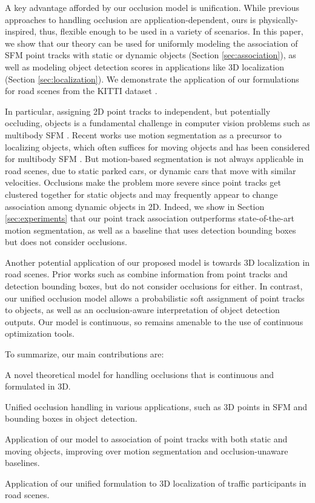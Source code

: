 A key advantage afforded by our occlusion model is unification. While previous approaches to handling occlusion are application-dependent, ours is physically-inspired, thus, flexible enough to be used in a variety of scenarios. In this paper, we show that our theory can be used for uniformly modeling the association of SFM point tracks with static or dynamic objects (Section \ref{sec:association}), as well as modeling object detection scores in applications like 3D localization (Section \ref{sec:localization}). We demonstrate the application of our formulations for road scenes from the KITTI dataset \cite{Geiger_etal_2012}.


In particular, assigning 2D point tracks to independent, but potentially occluding, objects is a fundamental challenge in computer vision problems such as multibody SFM \cite{Ozden_etal_2010}. Recent works use motion segmentation \cite{Rao_etal_2010,Brox_Malik_2010} as a precursor to localizing objects, which often suffices for moving objects \cite{Tron_Vidal_2007} and has been considered for multibody SFM \cite{Kundu_etal_2011}. But motion-based segmentation is not always applicable in road scenes, due to static parked cars, or dynamic cars that move with similar velocities. Occlusions make the problem more severe since point tracks get clustered together for static objects and may frequently appear to change association among dynamic objects in 2D.
Indeed, we show in Section \ref{sec:experiments} that our point track association outperforms state-of-the-art motion segmentation, as well as a baseline that uses detection bounding boxes but does not consider occlusions.

Another potential application of our proposed model is towards 3D localization in road scenes. Prior works such as \cite{Song_Chandraker_2015} combine information from point tracks and detection bounding boxes, but do not consider occlusions for either. In contrast, our unified occlusion model allows a probabilistic soft assignment of point tracks to objects, as well as an occlusion-aware interpretation of object detection outputs. Our model is continuous, so remains amenable to the use of continuous optimization tools.

To summarize, our main contributions are:
\vspace{-0.2cm}
\begin{tight_itemize}
\item A novel theoretical model for handling occlusions that is continuous and formulated in 3D.
\item Unified occlusion handling in various applications, such as 3D points in SFM and bounding boxes in object detection.
\item Application of our model to association of point tracks with both static and moving objects, improving over motion segmentation and occlusion-unaware baselines.
\item Application of our unified formulation to 3D localization of traffic participants in road scenes.
\end{tight_itemize}



